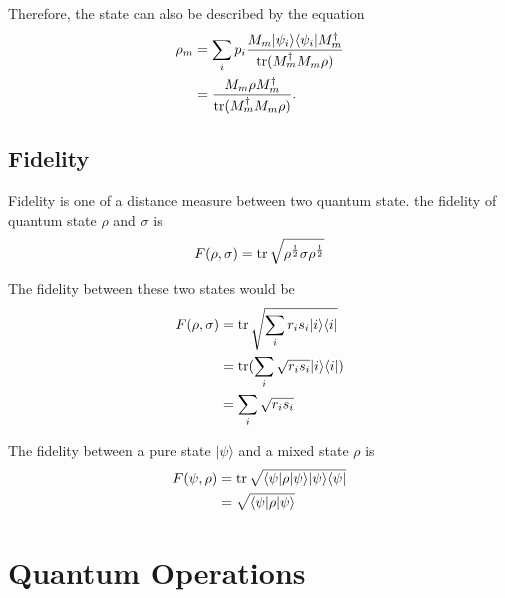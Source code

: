 Therefore, the state can also be described by the equation
\begin{equation}
  \begin{split}
    \rho_m &= \sum_i p_i \frac{M_m|\psi_i\rangle\langle\psi_i|M^{\dagger}_m}{\operatorname{tr}(M^{\dagger}_m M_m \rho)} \\
    &= \frac{M_m \rho M^{\dagger}_m}{\operatorname{tr}(M^{\dagger}_m M_m \rho)}.
  \end{split}
\end{equation}


 \subsection{Fidelity}

 Fidelity is one of a distance measure between two quantum state. the fidelity of quantum state $\rho$ and $\sigma$ is
 \begin{equation}
  \begin{split}
    F(\rho, \sigma) &= \operatorname{tr}{\sqrt{\rho^{\frac{1}{2}}\sigma\rho^{\frac{1}{2}}}} \\
  \end{split}
\end{equation}

The fidelity between these two states would be
\begin{equation}
  \begin{split}
    F(\rho, \sigma) &= \operatorname{tr}{\sqrt{\sum_i r_i s_i |i\rangle\langle i|}} \\
    &= \operatorname{tr}(\sum_i \sqrt{r_i s_i} |i\rangle\langle i|) \\
    &= \sum_i \sqrt{r_i s_i}
  \end{split}
\end{equation}

The fidelity between a pure state $|\psi\rangle$ and a mixed state $\rho$ is 
\begin{equation}
  \begin{split}
    F(\psi, \rho) &= \operatorname{tr}{\sqrt{\langle\psi|\rho|\psi\rangle|\psi\rangle\langle\psi|}} \\
    &= \sqrt{\langle\psi|\rho|\psi\rangle}
  \end{split}
\end{equation}

\section{Quantum Operations}

